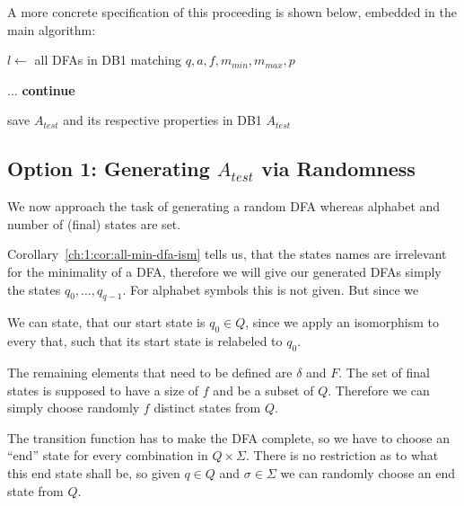 A more concrete specification of this proceeding is shown below, embedded in the main algorithm:
\vspace{0.2cm}
\begin{algorithmic}[1]
	
		\vspace{0.2cm}
	
		\State $l \gets$ all DFAs in DB1 matching $q, a, f, m_{min}, m_{max}, p$
		
		\vspace{0.2cm}
		
		
		\vspace{0.2cm}
		
			\State $\ldots$
				\State \textbf{continue}
			\EndIf
			
			\vspace{0.2cm}
			
			\State save $A_{test}$ and its respective properties in DB1
			\State\Return $A_{test}$
		\EndWhile
	\EndFunction
\end{algorithmic}
\vspace{0.2cm}

\subsection{Option 1: Generating $A_{test}$ via Randomness}

We now approach the task of generating a random DFA whereas alphabet and number of (final) states are set.

Corollary~\ref{ch:1:cor:all-min-dfa-ism} tells us, that the states names are irrelevant for the minimality of a DFA, therefore we will give our generated DFAs simply the states $q_0, \ldots, q_{q-1}$. For alphabet symbols this is not given. But since we 

We can state, that our start state is $q_0 \in Q$, since we apply an isomorphism to every that, such that its start state is relabeled to $q_0$.

The remaining elements that need to be defined are $\delta$ and $F$. The set of final states is supposed to have a size of $f$ and be a subset of $Q$. Therefore we can simply choose randomly $f$ distinct states from $Q$.

The transition function has to make the DFA complete, so we have to choose an ``end'' state for every combination in $Q \times \Sigma$. There is no restriction as to what this end state shall be, so given $q \in Q$ and $\sigma \in \Sigma$ we can randomly choose an end state from $Q$.

